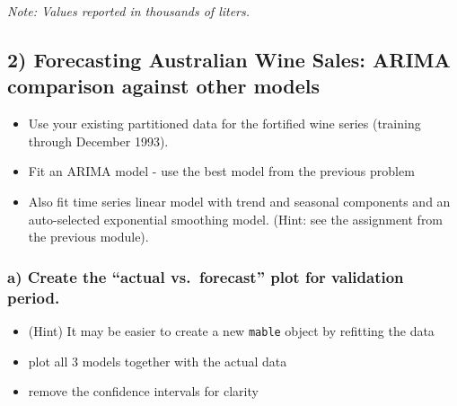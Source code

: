 \documentclass[
  letterpaper,
  DIV=11,
  numbers=noendperiod]{scrartcl}
\providecommand{\tightlist}{%
  \setlength{\itemsep}{0pt}\setlength{\parskip}{0pt}}
\begin{document}
\begin{center}
\textit{Note: Values reported in thousands of liters.}
\end{center}

\newpage

\subsection{2) Forecasting Australian Wine Sales: ARIMA comparison
against other
models}\label{forecasting-australian-wine-sales-arima-comparison-against-other-models}

\begin{itemize}
\tightlist
\item
  Use your existing partitioned data for the fortified wine series
  (training through December 1993).
\item
  Fit an ARIMA model - use the best model from the previous problem
\item
  Also fit time series linear model with trend and seasonal components
  and an auto-selected exponential smoothing model. (Hint: see the
  assignment from the previous module).
\end{itemize}

\subsubsection{a) Create the ``actual vs.~forecast'' plot for validation
period.}\label{a-create-the-actual-vs.-forecast-plot-for-validation-period.}

\begin{itemize}
\tightlist
\item
  (Hint) It may be easier to create a new \texttt{mable} object by
  refitting the data
\item
  plot all 3 models together with the actual data
\item
  remove the confidence intervals for clarity
\end{itemize}
\end{document}
